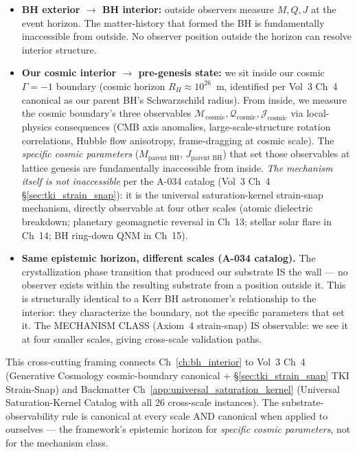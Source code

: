 \begin{itemize}
\item \textbf{BH exterior $\to$ BH interior:} outside observers measure
  $M, Q, J$ at the event horizon. The matter-history that formed the BH
  is fundamentally inaccessible from outside. No observer position outside
  the horizon can resolve interior structure.

\item \textbf{Our cosmic interior $\to$ pre-genesis state:} we sit inside
  our cosmic $\Gamma = -1$\gammaundeclared{} boundary (cosmic horizon $R_H \approx 10^{26}$~m,
  identified per Vol~3 Ch~4 canonical as our parent BH's Schwarzschild
  radius). From inside, we measure the cosmic boundary's three observables
  $\mathcal{M}_{\text{cosmic}}, \mathcal{Q}_{\text{cosmic}}, \mathcal{J}_{\text{cosmic}}$
  via local-physics consequences (CMB axis anomalies, large-scale-structure
  rotation correlations, Hubble flow anisotropy, frame-dragging at cosmic
  scale). The \emph{specific cosmic parameters} ($M_{\text{parent BH}}$,
  $J_{\text{parent BH}}$) that set those observables at lattice genesis
  are fundamentally inaccessible from inside.
  \emph{The mechanism itself is not inaccessible}
  per the A-034 catalog (Vol~3 Ch~4 \S\ref{sec:tki_strain_snap}): it is the
  universal saturation-kernel strain-snap mechanism, directly observable at
  four other scales (atomic dielectric breakdown;
  planetary geomagnetic reversal in Ch~13; stellar solar flare in Ch~14;
  BH ring-down QNM in Ch~15).

\item \textbf{Same epistemic horizon, different scales (A-034 catalog).}
  The crystallization phase transition that produced our substrate IS the
  wall --- no observer exists within the resulting substrate from a position
  outside it. This is structurally identical to a Kerr BH astronomer's
  relationship to the interior: they characterize the boundary, not the
  specific parameters that set it. The MECHANISM CLASS (Axiom~4 strain-snap)
  IS observable: we see it at four smaller scales, giving cross-scale
  validation paths.
\end{itemize}

This cross-cutting framing connects Ch~\ref{ch:bh_interior} to Vol~3 Ch~4
(Generative Cosmology cosmic-boundary canonical + \S\ref{sec:tki_strain_snap}
TKI Strain-Snap) and Backmatter Ch~\ref{app:universal_saturation_kernel}
(Universal Saturation-Kernel Catalog with all 26 cross-scale instances).
The substrate-observability rule is canonical at every scale AND canonical
when applied to ourselves --- the framework's epistemic horizon for
\emph{specific cosmic parameters}, not for the mechanism class.


